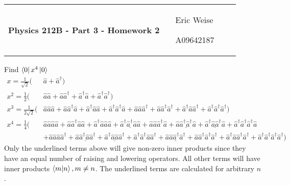 \documentclass{article}
\newcommand{\assignment}[1]{
    \newpage
    \begin{tabular}{p{0.65\linewidth}p{0.25\linewidth}}
        {\bf\LARGE Physics 212B - Part 3 - Homework #1 }
        &
        \parbox[b]{0.24\textwidth}{
            \hfill Eric Weise

            \hfill A09642187
            }
    \end{tabular}
    \vspace{12pt}
    \newline
}
\renewcommand{\RAISE}[0]{\hat{a}^{\dagger}}
\renewcommand{\LOWER}[0]{\hat{a}}
\begin{document}
\assignment{2}
Find \( \bra{0} x^4 \ket{0} \)
\begin{align*}
    x = \frac{1}{\sqrt{2}} \big( 
        &\LOWER + \RAISE
        \big) \\
    x^2 = \frac{1}{2} \big( 
        &\LOWER\LOWER + \LOWER\RAISE + \RAISE\LOWER + \RAISE\RAISE
        \big) \\
    x^3 = \frac{1}{2\sqrt{2}} \big( 
        & \LOWER\LOWER\LOWER + \LOWER\RAISE\LOWER + \RAISE\LOWER\LOWER + \RAISE\RAISE\LOWER
        + \LOWER\LOWER\RAISE + \LOWER\RAISE\RAISE + \RAISE\LOWER\RAISE + \RAISE\RAISE\RAISE
        \big) \\
    x^4 = \frac{1}{4} \big( 
        & \LOWER\LOWER\LOWER\LOWER + \LOWER\RAISE\LOWER\LOWER + \RAISE\LOWER\LOWER\LOWER + \underline{\RAISE\RAISE\LOWER\LOWER}
        + \LOWER\LOWER\RAISE\LOWER + \underline{\LOWER\RAISE\RAISE\LOWER} + \underline{\RAISE\LOWER\RAISE\LOWER} + \RAISE\RAISE\RAISE\LOWER \\
        &+ \LOWER\LOWER\LOWER\RAISE + \underline{\LOWER\RAISE\LOWER\RAISE} + \underline{\RAISE\LOWER\LOWER\RAISE} + \RAISE\RAISE\LOWER\RAISE
        + \underline{\LOWER\LOWER\RAISE\RAISE} + \LOWER\RAISE\RAISE\RAISE + \RAISE\LOWER\RAISE\RAISE + \RAISE\RAISE\RAISE\RAISE
        \big)
\end{align*}
Only the underlined terms above will give non-zero inner products since they have an equal number of raising and lowering operators.
All other terms will have inner products $\braket{m|n}, m\neq n$.
The underlined terms are calculated for arbitrary $n$.
\end{document}
